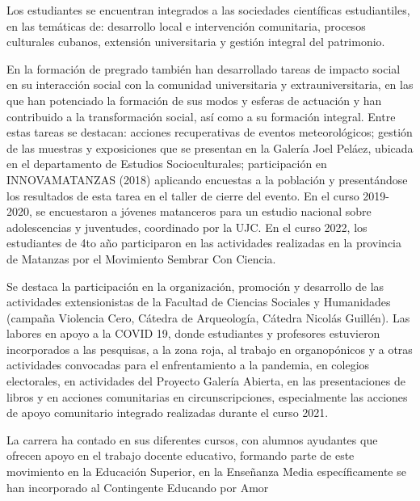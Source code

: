 Los estudiantes se encuentran integrados a las sociedades científicas estudiantiles, en las temáticas de: desarrollo local e intervención comunitaria, procesos culturales cubanos, extensión universitaria y gestión integral del patrimonio. 

En la formación de pregrado también han desarrollado tareas de impacto social en su interacción social con la comunidad universitaria y extrauniversitaria, en las que han potenciado la formación de sus modos y esferas de actuación y han contribuido a la transformación social, así como a su formación integral. Entre estas tareas se destacan: acciones recuperativas de eventos meteorológicos; gestión de las muestras y exposiciones que se presentan en la Galería Joel Peláez, ubicada en el departamento de Estudios Socioculturales; participación en INNOVAMATANZAS (2018) aplicando encuestas a la población y presentándose los resultados de esta tarea en el taller de cierre del evento. En el curso 2019-2020, se encuestaron a jóvenes matanceros para un estudio nacional sobre adolescencias y juventudes, coordinado por la UJC. En el curso 2022, los estudiantes de 4to año participaron en las actividades realizadas en la provincia de Matanzas por el Movimiento Sembrar Con Ciencia. 

Se destaca la participación en la organización, promoción y desarrollo de las actividades extensionistas de la Facultad de Ciencias Sociales y Humanidades (campaña Violencia Cero, Cátedra de Arqueología, Cátedra Nicolás Guillén). Las labores en apoyo a la COVID 19, donde estudiantes y profesores estuvieron incorporados a las pesquisas, a la zona roja, al trabajo en organopónicos y a otras actividades convocadas para el enfrentamiento a la pandemia, en colegios electorales, en actividades del Proyecto Galería Abierta, en las presentaciones de libros y en acciones comunitarias en circunscripciones, especialmente las acciones de apoyo comunitario integrado realizadas durante el curso 2021.

La carrera ha contado en sus diferentes cursos, con alumnos ayudantes que ofrecen apoyo en el trabajo docente educativo, formando parte de este movimiento en la Educación Superior, en la Enseñanza Media específicamente se han incorporado al Contingente Educando por Amor 

